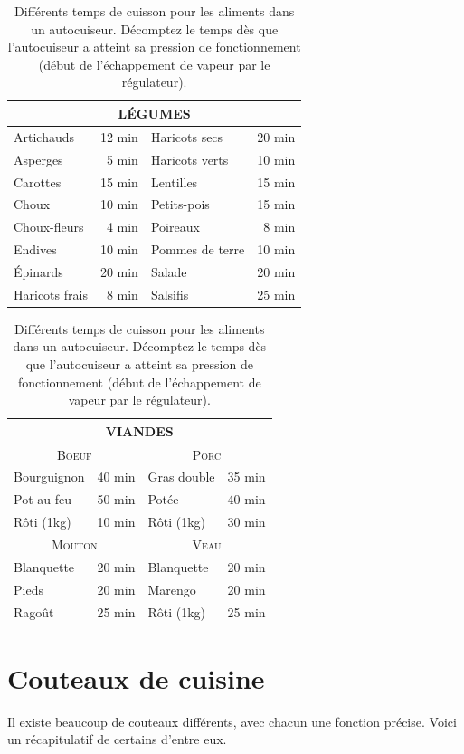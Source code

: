 \documentclass[a4paper,twoside]{report}
\begin{document}
\begin{table}[htb]
\centering
\begin{tabular}{|l|r||l|r|}
\hline
\multicolumn{4}{|c|}{\textbf{LÉGUMES}}\\\hline
Artichauds & 12 min & Haricots secs & 20 min\\\hline
Asperges & 5 min & Haricots verts & 10 min\\\hline
Carottes & 15 min & Lentilles & 15 min\\\hline
Choux & 10 min & Petits-pois & 15 min\\\hline
Choux-fleurs & 4 min & Poireaux & 8 min\\\hline
Endives & 10 min & Pommes de terre & 10 min\\\hline
Épinards & 20 min & Salade & 20 min\\\hline
Haricots frais & 8 min & Salsifis & 25 min\\\hline
\end{tabular}

\bigskip

\begin{tabular}{|l|r||l|r|}
\hline
\multicolumn{4}{|c|}{\textbf{VIANDES}}\\\hline
\multicolumn{2}{|c||}{\textsc{Boeuf}} & \multicolumn{2}{c|}{\textsc{Porc}}\\\hline
Bourguignon & 40 min & Gras double & 35 min\\\hline
Pot au feu & 50 min & Potée & 40 min\\\hline
Rôti (1kg) & 10 min & Rôti (1kg) & 30 min\\\hline
\multicolumn{2}{|c||}{\textsc{Mouton}} & \multicolumn{2}{c|}{\textsc{Veau}}\\\hline
Blanquette & 20 min & Blanquette & 20 min\\\hline
Pieds & 20 min & Marengo & 20 min\\\hline
Ragoût & 25 min & Rôti (1kg) & 25 min\\\hline
\end{tabular}

\caption{Différents temps de cuisson pour les aliments dans un autocuiseur. Décomptez le temps dès que l'autocuiseur a atteint sa pression de fonctionnement (début de l'échappement de vapeur par le régulateur).}\label{tab:cuisson_autocuiseur}
\end{table}

\section{Couteaux de cuisine}
Il existe beaucoup de couteaux différents, avec chacun une fonction précise. Voici un récapitulatif de certains d'entre eux.
\end{document}
